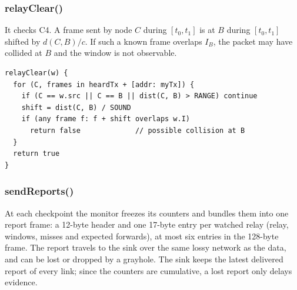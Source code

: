 \documentclass[conference]{IEEEtran}
\begin{document}
\subsubsection{relayClear()}
It checks C4. A frame sent by node $C$ during $[t_0,t_1]$ is at $B$ during $[t_0,t_1]$ shifted by $d(C,B)/c$. If such a known frame overlaps $I_B$, the packet may have collided at $B$ and the window is not observable.
\begin{lstlisting}
relayClear(w) {
  for (C, frames in heardTx + [addr: myTx]) {
    if (C == w.src || C == B || dist(C, B) > RANGE) continue
    shift = dist(C, B) / SOUND
    if (any frame f: f + shift overlaps w.I)
      return false             // possible collision at B
  }
  return true
}
\end{lstlisting}

\subsubsection{sendReports()}
At each checkpoint the monitor freezes its counters and bundles them into one report frame: a 12-byte header and one 17-byte entry per watched relay (relay, windows, misses and expected forwards), at most six entries in the 128-byte frame. The report travels to the sink over the same lossy network as the data, and can be lost or dropped by a grayhole. The sink keeps the latest delivered report of every link; since the counters are cumulative, a lost report only delays evidence.
\end{document}
